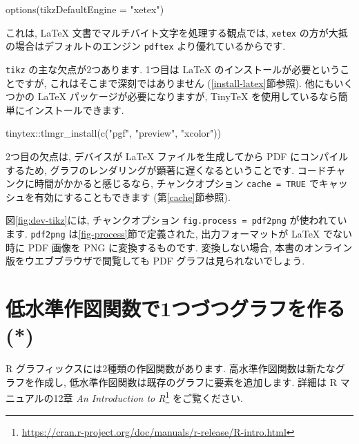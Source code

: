 \documentclass[
  11pt,
  lualatex,
  ja=standard]{bxjsreport}
\newenvironment{Shaded}{\begin{snugshade}}{\end{snugshade}}
\newcommand{\AttributeTok}[1]{\textcolor[rgb]{0.77,0.63,0.00}{#1}}
\newcommand{\FunctionTok}[1]{\textcolor[rgb]{0.00,0.00,0.00}{#1}}
\newcommand{\NormalTok}[1]{#1}
\newcommand{\SpecialCharTok}[1]{\textcolor[rgb]{0.00,0.00,0.00}{#1}}
\newcommand{\StringTok}[1]{\textcolor[rgb]{0.31,0.60,0.02}{#1}}
\renewcommand{\href}[2]{#2\footnote{\url{#1}}}
\begin{document}
\begin{Shaded}
\begin{Highlighting}[numbers=left,,]
\FunctionTok{options}\NormalTok{(}\AttributeTok{tikzDefaultEngine =} \StringTok{"xetex"}\NormalTok{)}
\end{Highlighting}
\end{Shaded}

これは, LaTeX 文書でマルチバイト文字を処理する観点では, \texttt{xetex} の方が大抵の場合はデフォルトのエンジン \texttt{pdftex} より優れているからです.

\texttt{tikz} の主な欠点が2つあります. 1つ目は LaTeX のインストールが必要ということですが, これはそこまで深刻ではありません (\ref{install-latex}節参照). 他にもいくつかの LaTeX パッケージが必要になりますが, TinyTeX を使用しているなら簡単にインストールできます.

\begin{Shaded}
\begin{Highlighting}[numbers=left,,]
\NormalTok{tinytex}\SpecialCharTok{::}\FunctionTok{tlmgr\_install}\NormalTok{(}\FunctionTok{c}\NormalTok{(}\StringTok{"pgf"}\NormalTok{, }\StringTok{"preview"}\NormalTok{, }\StringTok{"xcolor"}\NormalTok{))}
\end{Highlighting}
\end{Shaded}

2つ目の欠点は, デバイスが LaTeX ファイルを生成してから PDF にコンパイルするため, グラフのレンダリングが顕著に遅くなるということです. コードチャンクに時間がかかると感じるなら, チャンクオプション \texttt{cache = TRUE} でキャッシュを有効にすることもできます (第\ref{cache}節参照).

図\ref{fig:dev-tikz}には, チャンクオプション \texttt{fig.process = pdf2png} が使われています. \texttt{pdf2png} は\ref{fig-process}節で定義された, 出力フォーマットが LaTeX でない時に PDF 画像を PNG に変換するものです. 変換しない場合, 本書のオンライン版をウエブブラウザで閲覧しても PDF グラフは見られないでしょう.

\hypertarget{low-plots}{%
\section{低水準作図関数で1つづつグラフを作る (*)}\label{low-plots}}

R グラフィックスには2種類の作図関数があります. 高水準作図関数は新たなグラフを作成し, 低水準作図関数は既存のグラフに要素を追加します. 詳細は R マニュアルの12章 \href{https://cran.r-project.org/doc/manuals/r-release/R-intro.html}{\emph{An Introduction to R}} をご覧ください.
\end{document}
